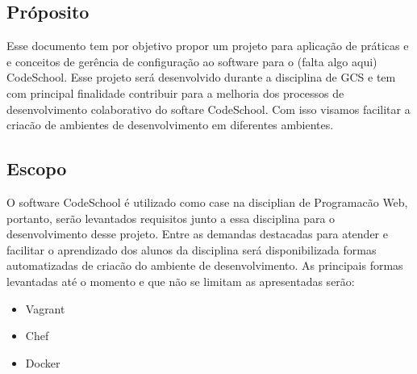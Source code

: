 \documentclass{article}
\begin{document}
\subsection{Próposito}

Esse documento tem por objetivo propor um projeto para aplicação de práticas e e conceitos de gerência de configuração ao software para o (falta algo aqui) CodeSchool. Esse projeto será desenvolvido durante a disciplina de GCS e tem com principal finalidade contribuir para a melhoria dos processos de desenvolvimento colaborativo do softare CodeSchool. Com isso visamos facilitar a criacão de ambientes de desenvolvimento em diferentes ambientes. 

\subsection{Escopo}

O software CodeSchool é utilizado como case na disciplian de Programacão Web, portanto, serão levantados requisitos junto a essa disciplina para o desenvolvimento desse projeto. Entre as demandas destacadas para atender e facilitar o aprendizado dos alunos da disciplina será disponibilizada formas automatizadas de criacão do ambiente de desenvolvimento. As principais formas levantadas até o momento e que não se limitam as apresentadas serão:

\begin{itemize}
    \item Vagrant 
    \item Chef
    \item Docker
\end{itemize}
  
\newpage
\end{document}
